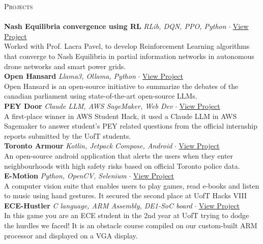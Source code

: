 \documentclass[a4paper]{article}
\newcommand{\lineunder} {
    \vspace*{-8pt} \\
    \hspace*{-18pt} \hrulefill \\
}
\newcommand{\header} [1] {
    {\hspace*{-18pt}\vspace*{6pt} \textsc{#1}}
    \vspace*{-6pt} \lineunder
}
\begin{document}
\header{Projects}
{\textbf{Nash Equilibria convergence using RL}} {\sl RLib, DQN, PPO, Python} $\cdot$ \href{https://github.com/BoundlessDevelopment/Capstone-Project}{View Project}\\
Worked with Prof. Lacra Pavel, to develop Reinforcement Learning algorithms that converge to Nash Equilibria in partial information networks
 in autonomous drone networks and smart power grids.\\
\vspace*{2mm}
{\textbf{Open Hansard}} {\sl Llama3, Ollama, Python} $\cdot$ \href{https://github.com/pandyah5/open-hansard}{View Project}\\
Open Hansard is an open-source initiative to summarize the debates of the canadian parliament using state-of-the-art open-source LLMs.\\
\vspace*{2mm}
{\textbf{PEY Door}} {\sl Claude LLM, AWS SageMaker, Web Dev} $\cdot$ \href{https://devpost.com/software/peydoor}{View Project}\\
A first-place winner in AWS Student Hack, it used a Claude LLM in AWS Sagemaker to answer student's PEY related questions from the official internship reports submitted by the UofT students.\\
\vspace*{2mm}
{\textbf{Toronto Armour}} {\sl Kotlin, Jetpack Compose, Android} $\cdot$ \href{https://github.com/pandyah5/TorontoArmour}{View Project} \\
An open-source android application that alerts the users when they enter neighbourhoods with high safety risks based on official Toronto police data.\\
\vspace*{2mm}
{\textbf{E-Motion}} {\sl Python, OpenCV, Selenium} $\cdot$ \href{https://devpost.com/software/e-motion-otbl2i}{View Project} \\
A computer vision suite that enables users to play games, read e-books and listen to music using hand gestures. It secured the second place at UofT Hacks VIII\\
\vspace*{2mm}
{\textbf{ECE-Hustler}} {\sl C language, ARM Assembly, DE1-SoC board} $\cdot$ \href{https://github.com/pandyah5/ECE-Hustler}{View Project} \\
In this game you are an ECE student in the 2nd year at UofT trying to dodge the hurdles we faced! It is an obstacle course compiled on our custom-built ARM processor and displayed on a VGA display.\\
\end{document}
